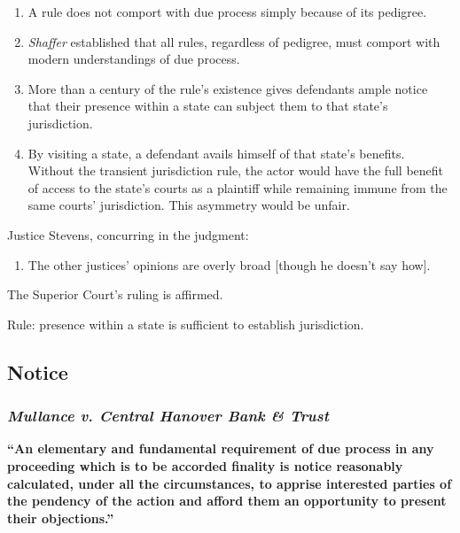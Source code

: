 \begin{enumerate}
\item
  A rule does not comport with due process simply because of its
  pedigree.
\item
  \emph{Shaffer} established that all rules, regardless of pedigree,
  must comport with modern understandings of due process.
\item
  More than a century of the rule's existence gives defendants ample
  notice that their presence within a state can subject them to that
  state's jurisdiction.
\item
  By visiting a state, a defendant avails himself of that state's
  benefits. Without the transient jurisdiction rule, the actor would
  have the full benefit of access to the state's courts as a plaintiff
  while remaining immune from the same courts' jurisdiction. This
  asymmetry would be unfair.
\end{enumerate}

Justice Stevens, concurring in the judgment:

\begin{enumerate}
\item
  The other justices' opinions are overly broad {[}though he doesn't say
  how{]}.
\end{enumerate}

The Superior Court's ruling is affirmed.

Rule: presence within a state is sufficient to establish jurisdiction.


\subsection{Notice}

\subsubsection{\emph{Mullance v. Central Hanover Bank \& Trust}}

\textbf{``An elementary and fundamental requirement of due process in any 
proceeding which is to be accorded finality is notice reasonably calculated, 
under all the circumstances, to apprise interested parties of the pendency of 
the action and afford them an opportunity to present their objections.''}

